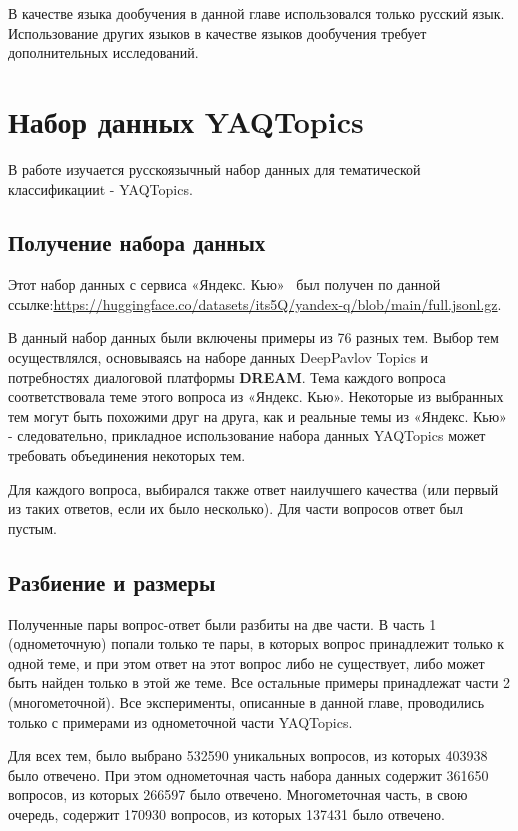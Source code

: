 В качестве языка дообучения в данной главе использовался только русский язык. Использование других языков в качестве языков дообучения требует дополнительных исследований.

\section{Набор данных {YAQTopics}}

В работе изучается русскоязычный набор данных для тематической классификацииt - {YAQTopics}.
\subsection{Получение набора данных}
Этот набор данных с сервиса «Яндекс. Кью»~\cite{yandex_q} был получен по данной ссылке:\url{https://huggingface.co/datasets/its5Q/yandex-q/blob/main/full.jsonl.gz}.

В данный набор данных были включены примеры из 76 разных тем. Выбор тем осуществлялся, основываясь на наборе данных {DeepPavlov Topics} и потребностях диалоговой платформы \textbf{DREAM}. Тема каждого вопроса соответствовала теме этого вопроса из «Яндекс. Кью». Некоторые из выбранных тем могут быть похожими друг на друга, как и реальные темы из «Яндекс. Кью» - следовательно, прикладное использование набора данных {YAQTopics} может требовать объединения некоторых тем.

 Для каждого вопроса, выбирался также ответ наилучшего качества (или первый из таких ответов, если их было несколько). Для части вопросов ответ был пустым. 
 


\subsection{Разбиение и размеры}
Полученные пары вопрос-ответ были разбиты на две части. В часть 1 (однометочную) попали только те пары, в которых вопрос принадлежит только к одной теме, и при этом ответ на этот вопрос либо не существует, либо может быть найден только в этой же теме. Все остальные примеры принадлежат части 2 (многометочной). Все эксперименты, описанные в данной главе, проводились только с примерами из однометочной части {YAQTopics}.


Для всех тем, было выбрано 532590 уникальных вопросов, из которых 403938 было отвечено. При этом однометочная часть набора данных содержит 361650 вопросов, из которых 266597 было отвечено. Многометочная часть, в свою очередь, содержит 170930 вопросов, из которых 137431 было отвечено.


